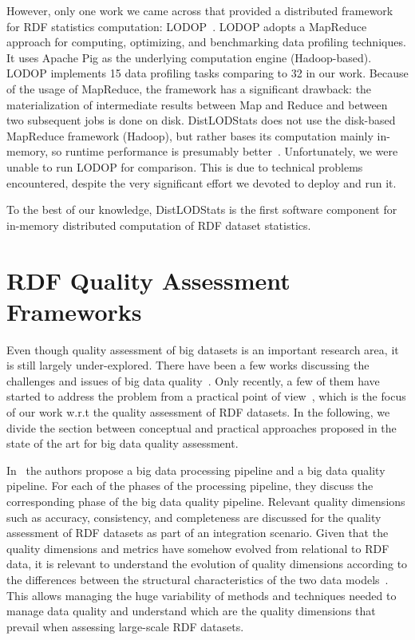 However, only one work we came across that provided a distributed framework for \gls{RDF} statistics computation: LODOP~\cite{Forchhammer:PROFILES:14}.
LODOP adopts a MapReduce approach for computing, optimizing, and benchmarking data profiling techniques.
It uses Apache Pig as the underlying computation engine (Hadoop-based). 
LODOP implements 15 data profiling tasks comparing to 32 in our work. 
Because of the usage of MapReduce, the framework has a significant drawback: the materialization of intermediate results between Map and Reduce and between two subsequent jobs is done on disk.
DistLODStats does not use the disk-based MapReduce framework (Hadoop), but rather bases its computation mainly in-memory, so runtime performance is presumably better~\cite{Shi:2015:CTM:2831360.2831365}.
Unfortunately, we were unable to run LODOP for comparison. This is due to technical problems encountered, despite the very significant effort we devoted to deploy and run it.

To the best of our knowledge, DistLODStats is the first software component for in-memory distributed computation of \gls{RDF} dataset statistics. 

\section{RDF Quality Assessment Frameworks}
Even though quality assessment of big datasets is an important research area, it is still largely under-explored. 
There have been a few works discussing the challenges and issues of big data quality~\cite{becker2015big, RaoG015, cai2015challenges}. 
Only recently, a few of them have started to address the problem from a practical point of view~\cite{debattista2016luzzu}, which is the focus of our work w.r.t the quality assessment of \gls{RDF} datasets.
In the following, we divide the section between conceptual and practical approaches proposed in the state of the art for big data quality assessment.

In~\cite{CatarciSCD17} the authors propose a big data processing pipeline and a big data quality pipeline. 
For each of the phases of the processing pipeline, they discuss the corresponding phase of the big data quality pipeline.
Relevant quality dimensions such as accuracy, consistency, and completeness are discussed for the quality assessment of \gls{RDF} datasets as part of an integration scenario.
Given that the quality dimensions and metrics have somehow evolved from relational to \gls{RDF} data,
it is relevant to understand the evolution of quality dimensions according to the differences between the structural characteristics of the two data models~\cite{BatiniRSV15}. 
This allows managing the huge variability of methods and techniques needed to manage data quality and understand which are the quality dimensions that prevail when assessing large-scale \gls{RDF} datasets.

